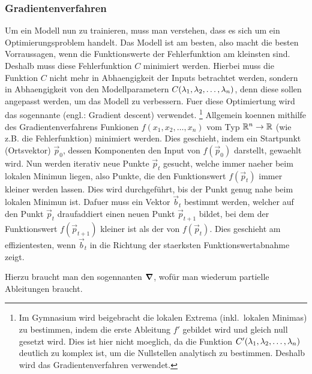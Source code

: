 \documentclass[../main]{subfiles}
\begin{document}
\subsubsection{Gradientenverfahren}\label{sec:gradientenverfahren}
Um ein Modell nun zu trainieren, muss man verstehen, dass es sich um ein Optimierungsproblem handelt.
Das Modell ist am besten, also macht die besten Vorraussagen, wenn die
Funktionswerte der Fehlerfunktion am kleinsten sind.
Deshalb muss diese Fehlerfunktion $C$ minimiert werden.
Hierbei muss die Funktion $C$ nicht mehr in Abhaengigkeit der Inputs betrachtet werden, sondern in Abhaengigkeit von den Modellparametern
$C(\lambda_1, \lambda_2, \ldots, \lambda_n)$, denn diese sollen angepasst werden, um das Modell zu verbessern.
Fuer diese Optimiertung wird das sogennante  (engl.: Gradient descent) verwendet.
\footnote{
  Im Gymnasium wird beigebracht die lokalen Extrema (inkl.\ lokalen Minimas) zu bestimmen, indem die erste Ableitung $f'$ gebildet wird und  gleich null gesetzt wird.
  Dies ist hier nicht moeglich, da die Funktion $C'(\lambda_1,\lambda_2, \ldots,
  \lambda_n)$ deutlich zu komplex ist, um die Nullstellen analytisch zu bestimmen. Deshalb wird das Gradientenverfahren verwendet.
}
\para{}
Allgemein koennen mithilfe des Gradientenverfahrens Funkionen $f(x_1, x_2, \ldots, x_n)$ vom Typ $\mathbb{R}^n \to \mathbb{R}$ (wie z.B. die Fehlerfunktion) minimiert werden.
Dies geschieht, indem ein Startpunkt (Ortsvektor) $\vec{p}_0$, dessen
Komponenten den Input von $f(\vec{p}_0)$ darstellt, gewaehlt wird.
Nun werden iterativ neue Punkte $\vec{p}_t$ gesucht, welche immer naeher beim lokalen Minimun liegen, also Punkte, die den Funktionswert $f(\vec{p}_t)$ immer kleiner werden lassen.
Dies wird durchgeführt, bis der Punkt genug nahe beim lokalen Minimun ist.
\para{}
Dafuer muss ein Vektor $\vec{b}_t$ bestimmt werden, welcher auf den Punkt $\vec{p}_t$ draufaddiert einen neuen Punkt $\vec{p}_{t+1}$ bildet,
bei dem der Funktionswert $f(\vec{p}_{t+1})$ kleiner ist als der von $f(\vec{p}_t)$.
Dies geschieht am effizientesten, wenn $\vec{b}_t$ in die Richtung der staerksten Funktionswertabnahme zeigt.

Hierzu braucht man den sogennanten  $\bm{\nabla}$, wofür man wiederum partielle Ableitungen braucht.
\para{}
\end{document}
